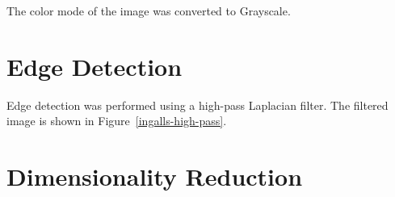 \documentclass[conference,compsoc]{IEEEtran}
\begin{document}




The color mode of the image was converted to Grayscale.



\section{Edge Detection}

Edge detection was performed using a high-pass Laplacian filter. The filtered image is shown in Figure~\ref{ingalls-high-pass}.


\section{Dimensionality Reduction}
\end{document}
